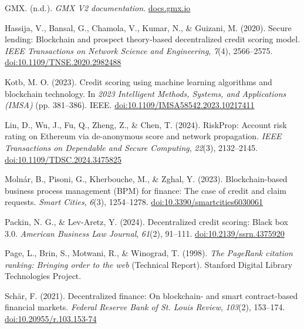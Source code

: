 \hangindent=0.5in  GMX. (n.d.). \textit{GMX V2 documentation}. \href{https://docs.gmx.io/}{docs.gmx.io}\par

\hangindent=0.5in  Hassija, V., Bansal, G., Chamola, V., Kumar, N., \& Guizani, M. (2020). Secure lending: Blockchain and prospect theory-based decentralized credit scoring model. \textit{IEEE Transactions on Network Science and Engineering}, \textit{7}(4), 2566--2575. \href{https://doi.org/10.1109/TNSE.2020.2982488}{doi:10.1109/TNSE.2020.2982488}\par

\hangindent=0.5in  Kotb, M. O. (2023). Credit scoring using machine learning algorithms and blockchain technology. In \textit{2023 Intelligent Methods, Systems, and Applications (IMSA)} (pp. 381--386). IEEE. \href{https://doi.org/10.1109/IMSA58542.2023.10217411}{doi:10.1109/IMSA58542.2023.10217411}\par

\hangindent=0.5in  Lin, D., Wu, J., Fu, Q., Zheng, Z., \& Chen, T. (2024). RiskProp: Account risk rating on Ethereum via de-anonymous score and network propagation. \textit{IEEE Transactions on Dependable and Secure Computing}, \textit{22}(3), 2132--2145. \href{https://doi.org/10.1109/TDSC.2024.3475825}{doi:10.1109/TDSC.2024.3475825}\par

\hangindent=0.5in  Moln\'{a}r, B., Pisoni, G., Kherbouche, M., \& Zghal, Y. (2023). Blockchain-based business process management (BPM) for finance: The case of credit and claim requests. \textit{Smart Cities}, \textit{6}(3), 1254--1278. \href{https://doi.org/10.3390/smartcities6030061}{doi:10.3390/smartcities6030061}\par

\hangindent=0.5in  Packin, N. G., \& Lev-Aretz, Y. (2024). Decentralized credit scoring: Black box 3.0. \textit{American Business Law Journal}, \textit{61}(2), 91--111. \href{https://doi.org/10.2139/ssrn.4375920}{doi:10.2139/ssrn.4375920}\par

\hangindent=0.5in  Page, L., Brin, S., Motwani, R., \& Winograd, T. (1998). \textit{The PageRank citation ranking: Bringing order to the web} (Technical Report). Stanford Digital Library Technologies Project.\par

\hangindent=0.5in  Sch\"{a}r, F. (2021). Decentralized finance: On blockchain- and smart contract-based financial markets. \textit{Federal Reserve Bank of St. Louis Review}, \textit{103}(2), 153--174. \href{https://doi.org/10.20955/r.103.153-74}{doi:10.20955/r.103.153-74}\par

